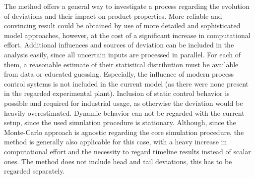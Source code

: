 \documentclass[DIV=13]{scrartcl}
\begin{document}
The method offers a general way to investigate a process regarding the evolution of deviations and their impact on product properties.
More reliable and convincing result could be obtained by use of more detailed and sophisticated model approaches, however, at the cost of a significant increase in computational effort.
Additional influences and sources of deviation can be included in the analysis easily, since all uncertain inputs are processed in parallel.
For each of them, a reasonable estimate of their statistical distribution must be available from data or educated guessing.
Especially, the influence of modern process control systems is not included in the current model (as there were none present in the regarded experimental plant).
Inclusion of static control behavior is possible and required for industrial usage, as otherwise the deviation would be heavily overestimated.
Dynamic behavior can not be regarded with the current setup, since the used simulation procedure is stationary.
Although, since the Monte-Carlo approach is agnostic regarding the core simulation procedure, the method is generally also applicable for this case, with a heavy increase in computational effort and the necessity to regard timeline results instead of scalar ones.
The method does not include head and tail deviations, this has to be regarded separately.

\printbibliography
\end{document}
